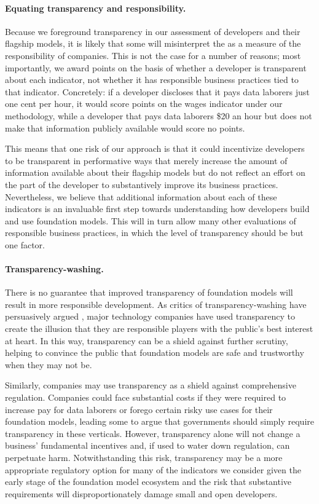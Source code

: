 \paragraph{Equating transparency and responsibility.} 
Because we foreground transparency in our assessment of developers and their flagship models, it is likely that some will misinterpret the \projectname as a measure of the responsibility of companies. 
This is not the case for a number of reasons; most importantly, we award points on the basis of whether a developer is transparent about each indicator, not whether it has responsible business practices tied to that indicator.
Concretely: if a developer discloses that it pays data laborers just one cent per hour, it would score points on the wages indicator under our methodology, while a developer that pays data laborers \$20 an hour but does not make that information publicly available would score no points. 

This means that one risk of our approach is that it could incentivize developers to be transparent in performative ways that merely increase the amount of information available about their flagship models but do not reflect an effort on the part of the developer to substantively improve its business practices. 
Nevertheless, we believe that additional information about each of these indicators is an invaluable first step towards understanding how developers build and use foundation models. 
This will in turn allow many other evaluations of responsible business practices, in which the level of transparency should be but one factor.

\paragraph{Transparency-washing.} 
There is no guarantee that improved transparency of foundation models will result in more responsible development.
As critics of transparency-washing have persuasively argued \citep{zalnieriute2021transparency}, major technology companies have used transparency to create the illusion that they are responsible players with the public's best interest at heart.
In this way, transparency can be a shield against further scrutiny, helping to convince the public that foundation models are safe and trustworthy when they may not be.

Similarly, companies may use transparency as a shield against comprehensive regulation. 
Companies could face substantial costs if they were required to increase pay for data laborers or forego certain risky use cases for their foundation models, leading some to argue that governments should simply require transparency in these verticals.
However, transparency alone will not change a business' fundamental incentives and, if used to water down regulation, can perpetuate harm.
Notwithstanding this risk, transparency may be a more appropriate regulatory option for many of the indicators we consider given the early stage of the foundation model ecosystem and the risk that substantive requirements will disproportionately damage small and open developers.

